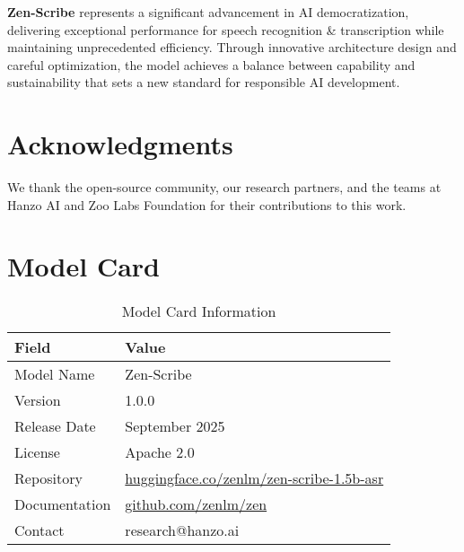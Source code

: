 \documentclass[11pt,a4paper]{article}
\begin{document}
\textbf{Zen-Scribe} represents a significant advancement in AI democratization, 
delivering exceptional performance for speech recognition & transcription while maintaining 
unprecedented efficiency. Through innovative architecture design and careful optimization, 
the model achieves a balance between capability and sustainability that sets a new standard 
for responsible AI development.

\section*{Acknowledgments}

We thank the open-source community, our research partners, and the teams at Hanzo AI and 
Zoo Labs Foundation for their contributions to this work.




\appendix

\section{Model Card}

\begin{table}[H]
\centering
\begin{tabular}{ll}
\toprule
\textbf{Field} & \textbf{Value} \\
\midrule
Model Name & Zen-Scribe \\
Version & 1.0.0 \\
Release Date & September 2025 \\
License & Apache 2.0 \\
Repository & \href{https://huggingface.co/zenlm/zen-scribe-1.5b-asr}{huggingface.co/zenlm/zen-scribe-1.5b-asr} \\
Documentation & \href{https://github.com/zenlm/zen}{github.com/zenlm/zen} \\
Contact & research@hanzo.ai \\
\bottomrule
\end{tabular}
\caption{Model Card Information}
\end{table}
\end{document}
